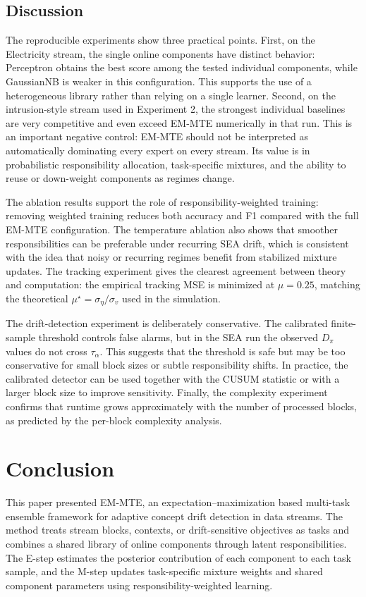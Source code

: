 ﻿\documentclass[12pt,a4paper]{article}
\begin{document}
\subsection{Discussion}
The reproducible experiments show three practical points. First, on the
Electricity stream, the single online components have distinct behavior:
Perceptron obtains the best score among the tested individual components,
while GaussianNB is weaker in this configuration. This supports the use of a
heterogeneous library rather than relying on a single learner. Second, on the
intrusion-style stream used in Experiment 2, the strongest individual
baselines are very competitive and even exceed EM-MTE numerically in that
run. This is an important negative control: EM-MTE should not be interpreted
as automatically dominating every expert on every stream. Its value is in
probabilistic responsibility allocation, task-specific mixtures, and the
ability to reuse or down-weight components as regimes change.

The ablation results support the role of responsibility-weighted training:
removing weighted training reduces both accuracy and F1 compared with the
full EM-MTE configuration. The temperature ablation also shows that smoother
responsibilities can be preferable under recurring SEA drift, which is
consistent with the idea that noisy or recurring regimes benefit from
stabilized mixture updates. The tracking experiment gives the clearest
agreement between theory and computation: the empirical tracking MSE is
minimized at $\mu=0.25$, matching the theoretical
$\mu^\star=\sigma_\eta/\sigma_v$ used in the simulation.

The drift-detection experiment is deliberately conservative. The calibrated
finite-sample threshold controls false alarms, but in the SEA run the
observed $D_\pi$ values do not cross $\tau_\alpha$. This suggests that the
threshold is safe but may be too conservative for small block sizes or subtle
responsibility shifts. In practice, the calibrated detector can be used
together with the CUSUM statistic or with a larger block size to improve
sensitivity. Finally, the complexity experiment confirms that runtime grows
approximately with the number of processed blocks, as predicted by the
per-block complexity analysis.

\section{Conclusion}
\label{sec:conclusion}
This paper presented EM-MTE, an expectation--maximization based multi-task ensemble framework for adaptive concept drift detection in data streams. The method treats stream blocks, contexts, or drift-sensitive objectives as tasks and combines a shared library of online components through latent responsibilities. The E-step estimates the posterior contribution of each component to each task sample, and the M-step updates task-specific mixture weights and shared component parameters using responsibility-weighted learning.
\end{document}
